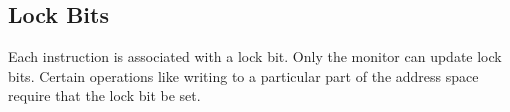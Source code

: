 \documentclass[12pt, letterpaper]{article}
\begin{document}

\subsection{Lock Bits}

Each instruction is associated with a lock bit.
Only the monitor can update lock bits.
Certain operations like writing to a particular part of the address space
require that the lock bit be set. 


\end{document}
